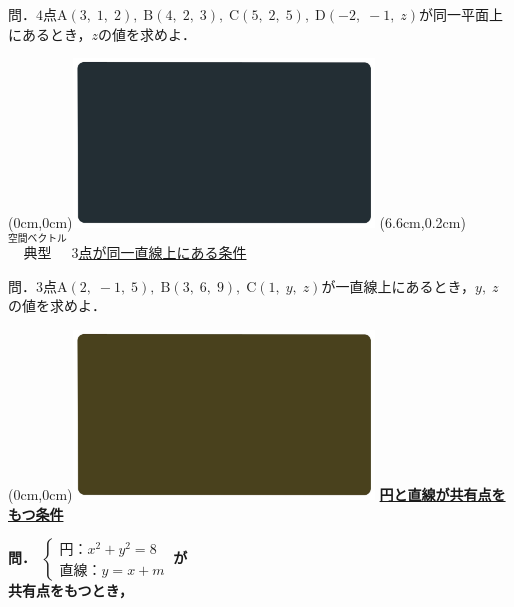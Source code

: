 \documentclass[10pt,
fleqn,
dvipdfmx,
uplatex
]{jsarticle}
\begin{document}
\Large 
問．$4$点$\text{A}\left(3,\;1,\;2\right),\;\text{B}\left(4,\;2,\;3\right),\;\text{C}\left(5,\;2,\;5\right),\;\text{D}\left(-2,\;-1,\;z\right)$が同一平面上にあるとき，$z$の値を求めよ．


\newpage



\at(0cm,0cm){\includegraphics[width=8cm,bb=0 0 1920 1080]{./youtube/thumbnails/templates/smart_background/空間ベクトル.jpeg}}
\at(6.6cm,0.2cm){\small\color{bradorange}$\overset{\text{空間ベクトル}}{\text{典型}}$}
{\color{orange}\Large\underline{$3$点が同一直線上にある条件}}\vspace{0.3zw}

\LARGE 
問．$3$点$\text{A}\left(2,\;-1,\;5\right),\;\text{B}\left(3,\;6,\;9\right),\;\text{C}\left(1,\;y,\;z\right)$が一直線上にあるとき，$y,\;z$の値を求めよ．


\newpage

\at(0cm,0cm){\includegraphics[width=8cm,bb=0 0 1920 1080]{./youtube/thumbnails/templates/smart_background/図形と方程式.jpeg}}
{\color{orange}\bf\boldmath\Large\underline{円と直線が共有点をもつ条件}}\vspace{0.3zw}

\large
\bf\boldmath 問．
$\left\{\begin{array}{l} 円：x^2+y^2=8\ \\直線：y=x+m\ \end{array}\right.$が\\

\Huge
\vspace{-0.2zw}
\hspace{0.2zw}
共有点をもつとき，
\end{document}
